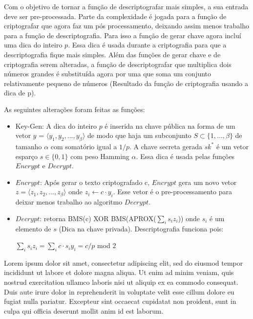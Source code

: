   	Com o objetivo de tornar a função de descriptografar mais simples, a sua entrada deve ser pre-processada. Parte da complexidade é jogada para a função de criptografar que agora faz um pós processamento, deixando assim menos trabalho para a função de descriptografia.
  	Para isso a função de gerar chave agora incluí uma dica do inteiro $p$. Essa dica é usada durante a criptografia para que a descriptografia fique mais simples.
  	Além das funções de gerar chave e de criptografia serem alteradas, a função de descriptografar que multiplica dois números grandes é substituída agora por uma que soma um conjunto relativamente pequeno de números (Resultado da função de criptografia usando a dica de p).
  	
  	As seguintes alterações foram feitas as funções:
  	\begin{itemize}
  		\item Key-Gen: A dica do inteiro $p$ é inserida na chave pública na forma de um vetor $y$ = $ \langle y_1, y_2, ..., y_{\beta} \rangle $ de modo que haja um subconjunto  $ S \subset \lbrace 1,...,\beta \rbrace $ de tamanho $ \alpha $ com somatório igual a $1/p$. A chave secreta gerada $sk^{*}$ é um vetor esparço $s \in \lbrace 0,1 \rbrace $ com peso Hamming $ \alpha $. Essa dica é usada pelas funções $Encrypt$ e $Decrypt$.
  		\item $Encrypt$: Após gerar o texto criptografado c, $Encrypt$ gera um novo vetor $z = \langle z_1, z_2, ..., z_{\beta} \rangle $ onde $ z_i \leftarrow c \cdot y_i $. Esse vetor é o pre-processamento para deixar menos trabalho ao algoritmo $Decrypt$.
  		\item $Decrypt$: retorna BMS(c) XOR BMS(APROX($ \sum_{i}^{} s_i z_i $)) onde $s_i$ é um elemento de $s$ (Dica na chave privada). Descriptografia funciona pois: \begin{center} $\sum_{i}^{} s_i z_i = \sum_{i}^{} c \cdot s_i y_i = c/p$ mod $2$ \end{center}
  		
  	\end{itemize}
	
	Lorem ipsum dolor sit amet, consectetur adipiscing elit, sed do eiusmod tempor incididunt ut labore et dolore magna aliqua. Ut enim ad minim veniam, quis nostrud exercitation ullamco laboris nisi ut aliquip ex ea commodo consequat. Duis aute irure dolor in reprehenderit in voluptate velit esse cillum dolore eu fugiat nulla pariatur. Excepteur sint occaecat cupidatat non proident, sunt in culpa qui officia deserunt mollit anim id est laborum.
  
